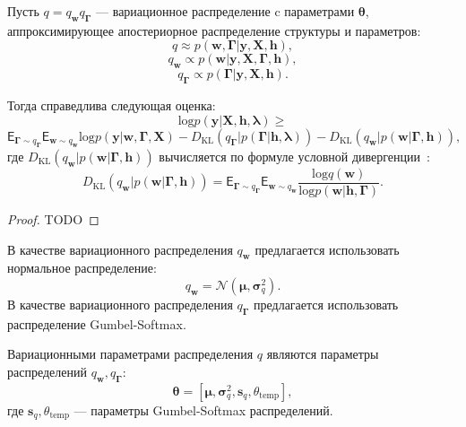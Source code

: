 \begin{theorem}
Пусть $q = q_{\mathbf{w}}q_{\boldsymbol{\Gamma}}$ --- вариационное распределение c параметрами $\boldsymbol{\theta}$, аппроксимирующее апостериорное распределение структуры и параметров:
\[
    q \approx p(\mathbf{w},\boldsymbol{\Gamma}|\mathbf{y}, \mathbf{X}, \mathbf{h}),
\]
\[
    q_{\mathbf{w}} \propto p(\mathbf{w}|\mathbf{y}, \mathbf{X},  \boldsymbol{\Gamma},\mathbf{h}),
\]
\[
    q_{\boldsymbol{\Gamma}} \propto p(\boldsymbol{\Gamma}|\mathbf{y}, \mathbf{X},  \mathbf{h}).
\]

Тогда справедлива следующая оценка:
\begin{equation}
\label{eq:full_elbo}
\text{log} p(\mathbf{y}|\mathbf{X}, \mathbf{h}, \boldsymbol{\lambda}) \geq
\end{equation}
\[
 \mathsf{E}_{\boldsymbol{\Gamma} \sim q_{\boldsymbol{\Gamma}}}\mathsf{E}_{\mathbf{w} \sim q_{\mathbf{w}}} \text{log}p(\mathbf{y}|\mathbf{w}, \boldsymbol{\Gamma}, \mathbf{X}) - D_\text{KL}\left(q_{\boldsymbol{\Gamma}}|p(\boldsymbol{\Gamma}|\mathbf{h}, \boldsymbol{\lambda})\right) - D_\text{KL}\left(q_{\mathbf{w}}|p(\mathbf{w}|\boldsymbol{\Gamma}, \mathbf{h})\right),
\]
где $D_\text{KL}\left(q_{\mathbf{w}}|p(\mathbf{w}|\boldsymbol{\Gamma}, \mathbf{h})\right)$ вычисляется по формуле условной дивергенции~\cite{TODO}:
\[
D_\text{KL}\left(q_{\mathbf{w}}|p(\mathbf{w}|\boldsymbol{\Gamma}, \mathbf{h})\right) = \mathsf{E}_{\boldsymbol{\Gamma} \sim q_{\boldsymbol{\Gamma}}} \mathsf{E}_{\mathbf{w} \sim q_{\mathbf{w}}} \frac{\text{log}q(\mathbf{w})}{\text{log}p(\mathbf{w}|\mathbf{h},\boldsymbol{\Gamma})}.
\]
\end{theorem}

\begin{proof}
TODO
\end{proof}

В качестве вариационного распределения $q_{\mathbf{w}}$ предлагается использовать нормальное распределение:
\[
    q_{\mathbf{w}} = \mathcal{N}(\boldsymbol{\mu}, \boldsymbol{\sigma}^2_q).
\]
В качестве вариационного распределения $q_{\boldsymbol{\Gamma}}$ предлагается использовать распределение Gumbel-Softmax.

Вариационными параметрами распределения $q$ являются параметры распределений $q_{\mathbf{w}}, q_{\boldsymbol{\Gamma}}$:
\[
    \boldsymbol{\theta} = [\boldsymbol{\mu}, \boldsymbol{\sigma}^2_q, \mathbf{s}_q, \theta_\text{temp}], 
\]
где $ \mathbf{s}_q, \theta_\text{temp}$ --- параметры Gumbel-Softmax распределений.

